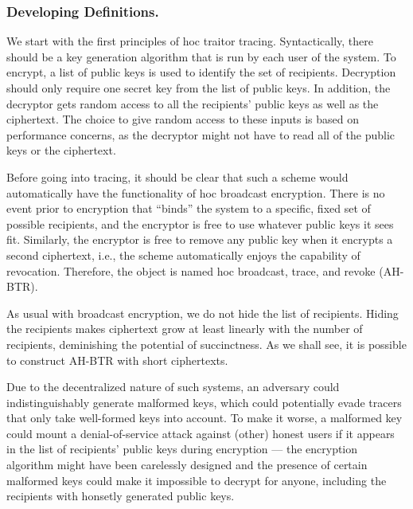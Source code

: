 \subsubsection{Developing Definitions.}
We start with the first principles of \ad hoc traitor tracing.
Syntactically, there should be a key generation algorithm that is run by each user of the system.
To encrypt, a list of public keys is used to identify the set of recipients.
Decryption should only require one secret key from the list of public keys.
In addition, the decryptor gets random access to all the recipients' public keys as well as the ciphertext.
The choice to give random access to these inputs is based on performance concerns, as the decryptor might not have to read all of the public keys or the ciphertext.

Before going into tracing, it should be clear that such a scheme would automatically have the functionality of \ad hoc broadcast encryption.
There is no event prior to encryption that ``binds'' the system to a specific, fixed set of possible recipients, and the encryptor is free to use whatever public keys it sees fit.
Similarly, the encryptor is free to remove any public key when it encrypts a second ciphertext, i.e., the scheme automatically enjoys the capability of revocation.
Therefore, the object is named \ad hoc broadcast, trace, and revoke (AH-BTR).

As usual with broadcast encryption, we do not hide the list of recipients.
Hiding the recipients makes ciphertext grow at least linearly with the number of recipients, deminishing the potential of succinctness.
As we shall see, it is possible to construct AH-BTR with short ciphertexts.

Due to the decentralized nature of such systems,
an adversary could indistinguishably generate malformed keys,
which could potentially evade tracers that only take well-formed keys into account.
To make it worse, a malformed key could mount a denial-of-service attack against (other) honest users if it appears in the list of recipients' public keys during encryption ---
the encryption algorithm might have been carelessly designed and the presence of certain malformed keys could make it impossible to decrypt for anyone, including the recipients with honsetly generated public keys.

